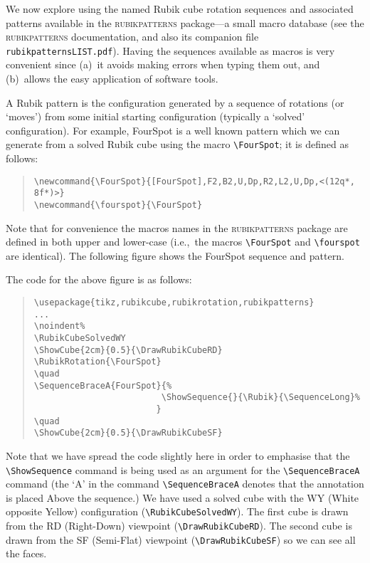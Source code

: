 \documentclass[a4paper]{article}
\begin{document}
We now explore using the named Rubik cube rotation sequences and associated 
patterns available in the  \textsc{rubikpatterns} package---a small macro database 
(see the \textsc{rubikpatterns} documentation, and also its companion file \texttt{rubikpatternsLIST.pdf}). Having  the sequences available as  macros is 
very convenient since (a)~it avoids making errors when typing them out, 
and (b)~allows the easy application of software tools.
 
 A Rubik pattern  is the configuration generated  by a sequence of rotations 
 (or `moves') from some initial starting configuration  (typically a `solved' 
 configuration).  For example, FourSpot is a well known pattern which we can  
 generate  from a solved Rubik cube  using the macro \verb!\FourSpot!;  it is 
 defined as follows:
\begin{quote}
\begin{verbatim}
\newcommand{\FourSpot}{[FourSpot],F2,B2,U,Dp,R2,L2,U,Dp,<(12q*, 8f*)>}
\newcommand{\fourspot}{\FourSpot}
\end{verbatim}
\end{quote}
 Note that for convenience the macros names in the \textsc{rubikpatterns} package 
 are defined in  both upper and lower-case (i.e.,~the macros \verb!\FourSpot! 
 and \verb!\fourspot! are identical).  The following figure shows the FourSpot 
 sequence and pattern. 

\bigskip

\noindent%
\RubikCubeSolvedWY
{}
\RubikRotation{\FourSpot}
\quad{}
\quad{}

\bigskip

{\noindent}The code for the above figure is as follows:


\begin{quote}
\begin{verbatim}
\usepackage{tikz,rubikcube,rubikrotation,rubikpatterns}
...
\noindent%
\RubikCubeSolvedWY
\ShowCube{2cm}{0.5}{\DrawRubikCubeRD}
\RubikRotation{\FourSpot}
\quad
\SequenceBraceA{FourSpot}{%
                         \ShowSequence{}{\Rubik}{\SequenceLong}%
                        }
\quad
\ShowCube{2cm}{0.5}{\DrawRubikCubeSF}
\end{verbatim} 
\end{quote}
Note that we have spread  the code slightly here in order to emphasise that 
the \verb!\ShowSequence! command is being used as an argument for the 
\verb!\SequenceBraceA! command (the `A' in the command \verb!\SequenceBraceA! 
denotes that the annotation is placed Above the sequence.)
We have used a solved cube with the WY (White opposite Yellow) 
configuration (\verb!\RubikCubeSolvedWY!).
The first cube is drawn from the  RD (Right-Down) viewpoint (\verb!\DrawRubikCubeRD!).
The second cube is drawn from the SF (Semi-Flat)  viewpoint (\verb!\DrawRubikCubeSF!) 
so we can see all the faces.
\end{document}

